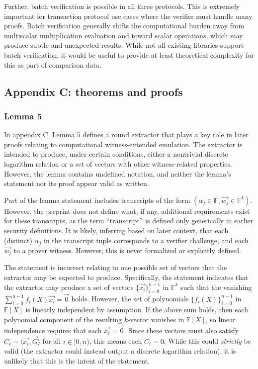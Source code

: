 \documentclass{article}
\begin{document}
Further, batch verification is possible in all three protocols.
This is extremely important for transaction protocol use cases where the verifier must handle many proofs.
Batch verification generally shifts the computational burden away from multiscalar multiplication evaluation and toward scalar operations, which may produce subtle and unexpected results.
While not all existing libraries support batch verification, it would be useful to provide at least theoretical complexity for this as part of comparison data.


\subsection{Appendix C: theorems and proofs}


\subsubsection{Lemma 5}

In appendix C, Lemma 5 defines a round extractor that plays a key role in later proofs relating to computational witness-extended emulation.
The extractor is intended to produce, under certain conditions, either a nontrivial discrete logarithm relation or a set of vectors with other witness-related properties.
However, the lemma contains undefined notation, and neither the lemma's statement nor its proof appear valid as written.

Part of the lemma statement includes transcripts of the form $(\alpha_j \in \mathbb{F}, \vec{w_j} \in \mathbb{F}^k)$.
However, the preprint does not define what, if any, additional requirements exist for these transcripts, as the term ``transcript'' is defined only generically in earlier security definitions.
It is likely, inferring based on later context, that each (distinct) $\alpha_j$ in the transcript tuple corresponds to a verifier challenge, and each $\vec{w_j}$ to a prover witness.
However, this is never formalized or explicitly defined.

The statement is incorrect relating to one possible set of vectors that the extractor may be expected to produce.
Specifically, the statement indicates that the extractor may produce a set of vectors $\{\vec{x_i}\}_{i=0}^{n-1}$ in $\mathbb{F}^k$ such that the vanishing $\sum_{i=0}^{n-1} f_i(X) \vec{x_i} = \vec{0}$ holds.
However, the set of polynomials $\{f_i(X)\}_{i=0}^{n-1}$ in $\mathbb{F}[X]$ is linearly independent by assumption.
If the above sum holds, then each polynomial component of the resulting $k$-vector vanishes in $\mathbb{F}[X]$, so linear independence requires that each $\vec{x_i} = \vec{0}$.
Since these vectors must also satisfy $C_i = \langle \vec{x_i}, \vec{G} \rangle$ for all $i \in [0, n)$, this means each $C_i = 0$.
While this could \textit{strictly} be valid (the extractor could instead output a discrete logarithm relation), it is unlikely that this is the intent of the statement.
\end{document}
